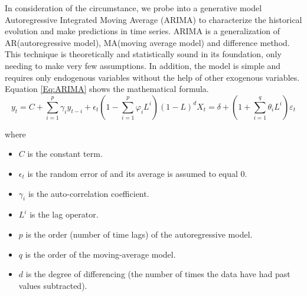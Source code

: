\documentclass{mcmthesis}
\begin{document}
In consideration of the circumstance, we probe into a generative model Autoregressive Integrated Moving Average (ARIMA) to characterize the historical evolution and make predictions in time series. ARIMA is a generalization of AR(autoregressive model), MA(moving average model) and difference method. This technique is theoretically and statistically sound in its foundation, only needing to make very few assumptions. In addition, the model is simple and requires only endogenous variables without the help of other exogenous variables. Equation \eqref{Eq:ARIMA} shows the  mathematical formula.
\begin{equation}
\label{Eq:ARIMA}
y_{t}=C+\sum_{i=1}^{p} \gamma_{i} y_{t-i}+\epsilon_{t}\left(1-\sum_{i=1}^{p} \varphi_{i} L^{i}\right)(1-L)^{d} X_{t}=\delta+\left(1+\sum_{i=1}^{q} \theta_{i} L^{i}\right) \varepsilon_{t}
\end{equation} 

where
\begin{itemize}
\item $C$ is the constant term.
\item $\epsilon_{t}$ is the random error of and its average is assumed to  equal 0.
\item $\gamma_{i}$ is the auto-correlation coefficient. 
\item $L^i$ is the lag operator.
\item $p$ is the order (number of time lags) of the autoregressive model.
\item $q$ is the order of the moving-average model.
\item $d$ is the degree of differencing (the number of times the data have had past values subtracted).
\end{itemize}
\end{document}
